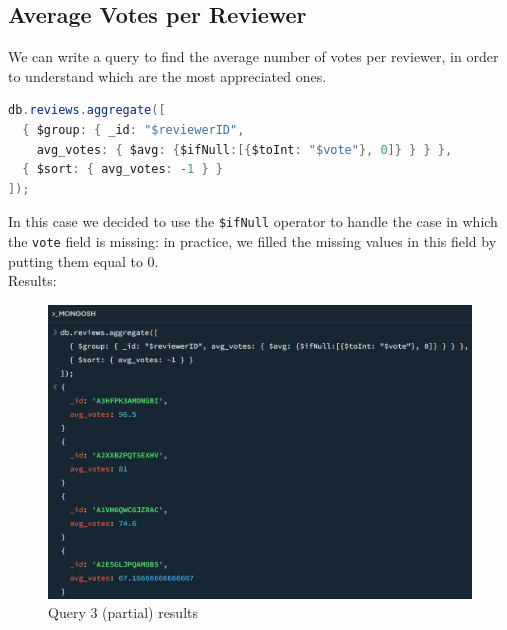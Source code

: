 \subsection{Average Votes per Reviewer}
We can write a query to find the average number of votes per reviewer, in order to understand which are the most appreciated ones. \\
\begin{lstlisting}[language=Java]
db.reviews.aggregate([
  { $group: { _id: "$reviewerID", 
    avg_votes: { $avg: {$ifNull:[{$toInt: "$vote"}, 0]} } } },
  { $sort: { avg_votes: -1 } }
]);
\end{lstlisting}
In this case we decided to use the \texttt{\$ifNull} operator to handle the case in which the \texttt{vote} field is missing: in practice, we filled the missing values in this field by putting them equal to 0. \\
Results:
\begin{figure}[H]
  \centering
  \includegraphics[scale=0.6]{Images/q3_result.png}
  \caption{Query 3 (partial) results}
  \label{fig:q3_result}
\end{figure}

\newpage
